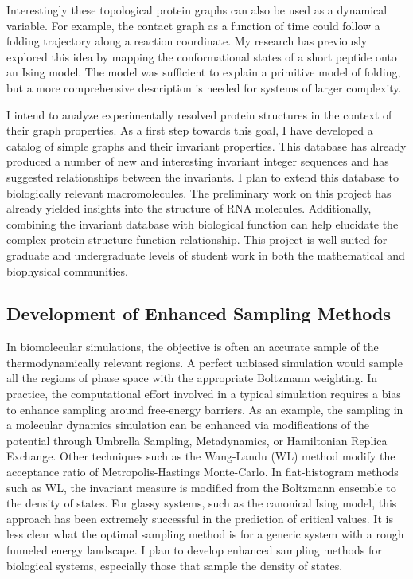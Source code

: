 \documentclass[]{scrartcl}
\newcommand{\insetpicture}[1]{\marginpar{\texttt{[image: \#1]}}}
\begin{document}
\begin{cleanCV}
Interestingly these topological protein graphs can also be used as a dynamical variable. 
For example, the contact graph as a function of time could follow a folding trajectory along a reaction coordinate.
My research has previously explored this idea by mapping the conformational states of a short peptide onto an Ising model. 
The model was sufficient to explain a primitive model of folding, but a more comprehensive description is needed for systems of larger complexity.

I intend to analyze experimentally resolved protein structures in the context of their graph properties.
As a first step towards this goal, I have developed a catalog of simple graphs and their invariant properties.
This database has already produced a number of new and interesting invariant integer sequences and has suggested relationships between the invariants.
\insetpicture{images/research/chromatic_zeros}
I plan to extend this database to biologically relevant macromolecules.
The preliminary work on this project has already yielded insights into the structure of RNA molecules.
Additionally, combining the invariant database with biological function can help elucidate the complex protein structure-function relationship.
This project is well-suited for graduate and undergraduate levels of student work in both the mathematical and biophysical communities.


\subsection{Development of Enhanced Sampling Methods}

In biomolecular simulations, the objective is often an accurate sample of the thermodynamically relevant regions.
A perfect unbiased simulation would sample all the regions of phase space with the appropriate Boltzmann weighting. 
In practice, the computational effort involved in a typical simulation requires a bias to enhance sampling around free-energy barriers.
As an example, the sampling in a molecular dynamics simulation can be enhanced via modifications of the potential through Umbrella Sampling, Metadynamics, or Hamiltonian Replica Exchange.
Other techniques such as the Wang-Landu (WL) method modify the acceptance ratio of Metropolis-Hastings Monte-Carlo.
\insetpicture{images/research/equilibrium}
In flat-histogram methods such as WL, the invariant measure is modified from the Boltzmann ensemble to the density of states.
For glassy systems, such as the canonical Ising model, this approach has been extremely successful in the prediction of critical values.
It is less clear what the optimal sampling method is for a generic system with a rough funneled energy landscape.
I plan to develop enhanced sampling methods for biological systems, especially those that sample the density of states.


\end{cleanCV}
\end{document}
